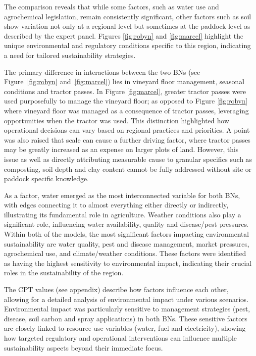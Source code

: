 The comparison reveals that while some factors, such as water use and agrochemical legislation, remain consistently significant, other factors such as soil show variation not only at a regional level but sometimes at the paddock level as described by the expert panel. Figures \ref{fig:robyn} and \ref{fig:marcel} highlight the unique environmental and regulatory conditions specific to this region, indicating a need for tailored sustainability strategies.

The primary difference in interactions between the two BNs (see Figure~\ref{fig:robyn} and~\ref{fig:marcel}) lies in vineyard floor management, seasonal conditions and tractor passes. In Figure \ref{fig:marcel}, greater tractor passes were used purposefully to manage the vineyard floor; as opposed to Figure \ref{fig:robyn} where vineyard floor was managed as a consequence of tractor passes, leveraging opportunities when the tractor was used. This distinction highlighted how operational decisions can vary based on regional practices and priorities. A point was also raised that scale can cause a further driving factor, where tractor passes may be greatly increased as an expense on larger plots of land. However, this issue as well as directly attributing measurable cause to granular specifics such as composting, soil depth and clay content cannot be fully addressed without site or paddock specific knowledge.

As a factor, water emerged as the most interconnected variable for both BNs, with edges connecting it to almost everything either directly or indirectly, illustrating its fundamental role in agriculture. Weather conditions also play a significant role, influencing water availability, quality and disease/pest pressures. Within both of the models, the most significant factors impacting environmental sustainability are water quality, pest and disease management, market pressures, agrochemical use, and climate/weather conditions. These factors were identified as having the highest sensitivity to environmental impact, indicating their crucial roles in the sustainability of the region.

The CPT values (see appendix) describe how factors influence each other, allowing for a detailed analysis of environmental impact under various scenarios. Environmental impact was particularly sensitive to management strategies (pest, disease, soil carbon and spray applications) in both BNs. These sensitive factors are closely linked to resource use variables (water, fuel and electricity), showing how targeted regulatory and operational interventions can influence multiple sustainability aspects beyond their immediate focus. 


